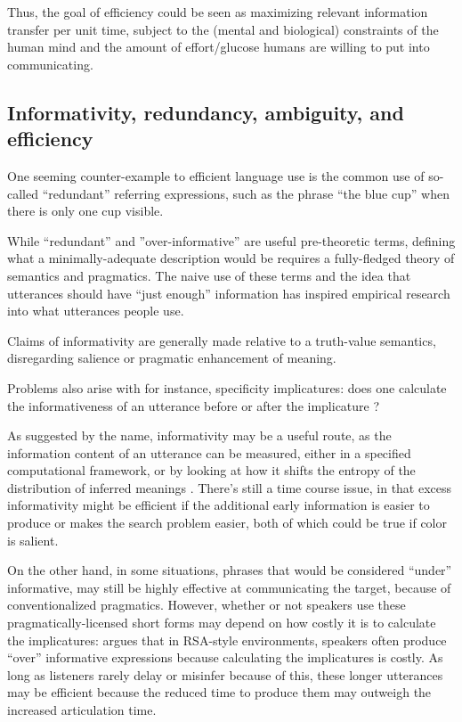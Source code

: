 \documentclass[]{article}
\begin{document}
Thus, the goal of efficiency could be seen as maximizing relevant information transfer per unit time, subject to the (mental and biological) constraints of the human mind and the amount of effort/glucose humans are willing to put into communicating. 

\subsection{Informativity, redundancy, ambiguity, and efficiency}
One seeming counter-example to efficient language use is the common use of so-called ``redundant'' referring expressions, such as the phrase ``the blue cup'' when there is only one cup visible.  

While ``redundant'' and ''over-informative'' are useful pre-theoretic terms, defining what a minimally-adequate description would be requires a fully-fledged theory of semantics and pragmatics. The naive use of these terms and the idea that utterances should have ``just enough'' information has inspired empirical research into what utterances people use. 

Claims of informativity are generally made relative to a truth-value semantics, disregarding salience or pragmatic enhancement of meaning. 

 Problems also arise with for instance, specificity implicatures: does one calculate the informativeness of an utterance before or after the implicature \cite{bergen}?


As suggested by the name, informativity may be a useful route, as the information content of an utterance can be measured, either in a specified computational framework, or by looking at how it shifts the entropy of the distribution of inferred meanings \cite{degen20200406}. There's still a time course issue, in that excess informativity might be efficient if the additional early information is easier to produce or makes the search problem easier, both of which could be true if color is salient. 

On the other hand, in some situations, phrases that would be considered ``under'' informative, may still be highly effective at communicating the target, because of conventionalized pragmatics. However, whether or not speakers use these pragmatically-licensed short forms may depend on how costly it is to calculate the implicatures:  \cite{baumann2014} argues that in RSA-style environments, speakers often produce ``over'' informative expressions because calculating the implicatures is costly. As long as listeners rarely delay or misinfer because of this, these longer utterances may be efficient because the reduced time to produce them may outweigh the increased articulation time. 
\end{document}
